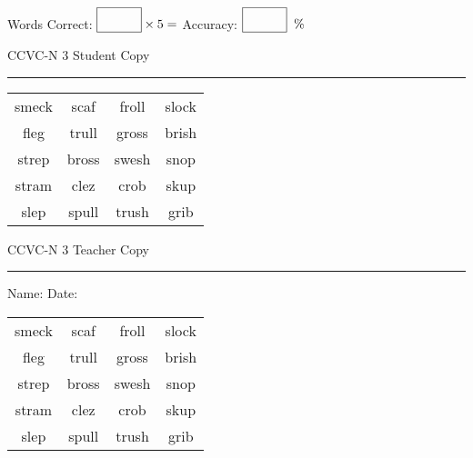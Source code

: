 \documentclass{memoir}
\begin{document}
\small

Words Correct: $\fbox{\phantom{\huge 100}} \times 5 = $ Accuracy: $\fbox{\phantom{\huge 100}}\;\; \%$ 

\vfill

\newpage


\footnotesize \noindent
CCVC-N 3 \hfill Student Copy
\smallskip
\hrule

\Large

\setlength{\tabcolsep}{14pt}
\def\arraystretch{3}

{\selectfont


\begin{vplace}[0.5]
\begin{center}
\begin{tabular}{cccc}
smeck & scaf & froll & slock            \\
fleg             & trull & gross                    & brish \\
strep & bross       & swesh & snop \\
stram & clez & crob & skup \\
slep            & spull & trush & grib                    \\
\end{tabular}
\end{center}
\end{vplace}

}

\newpage

\footnotesize \noindent
CCVC-N 3 \hfill Teacher Copy
\smallskip
\hrule

\small

\vfill

\noindent
Name: \underline{\hspace{1.75in}} \hfill Date: \underline{\hspace{1in}}

\Large

{\selectfont


\begin{vplace}[0.5]
\begin{center}
\begin{tabular}{cccc}
smeck & scaf & froll & slock            \\
fleg             & trull & gross                    & brish \\
strep & bross       & swesh & snop \\
stram & clez & crob & skup \\
slep            & spull & trush & grib                    \\
\end{tabular}
\end{center}
\end{vplace}



}
\end{document}
